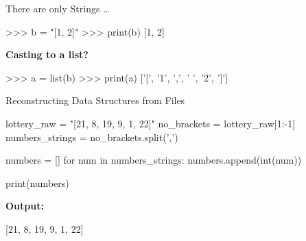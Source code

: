 \documentclass[
  american,
  ignorenonframetext,
]{beamer}
\newenvironment{pyexec}[1]{\noindent \textbf{Output: }  #1}{}
\begin{document}
\begin{frame}{There are only Strings \ldots{}}
\protect\hypertarget{there-are-only-strings}{}

\begin{pythoncode}

>>> b = "[1, 2]"
>>> print(b)
[1, 2]

\end{pythoncode}

\vspace{1em}

\textbf{Casting to a list?}

\begin{pythoncode}

>>> a = list(b)
>>> print(a)
['[', '1', ',', ' ', '2', ']']

\end{pythoncode}


\end{frame}

\begin{frame}{Reconstructing Data Structures from
Files}
\protect\hypertarget{reconstructing-data-structures-from-files}{}

\begin{pythoncode}

lottery_raw = "[21, 8, 19, 9, 1, 22]"
no_brackets = lottery_raw[1:-1]
numbers_strings = no_brackets.split(',')

numbers = []
for num in numbers_strings:
    numbers.append(int(num))

print(numbers)

\end{pythoncode}

\begin{pyexec}

\begin{outputcode}

[21, 8, 19, 9, 1, 22]

\end{outputcode}

\end{pyexec}


\end{frame}
\end{document}
